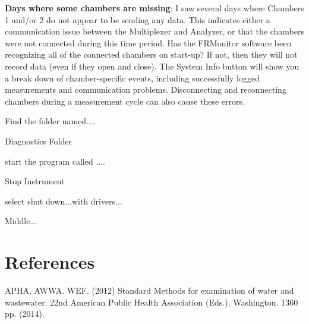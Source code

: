 \documentclass[12pt]{../SOP3}\usepackage[]{graphicx}\usepackage[]{color}
\begin{document}
\NP \textbf{Days where some chambers are missing}: 
 I saw several days where Chambers 1 and/or 2 do not appear to be sending any data. This indicates either a communication issue between the Multiplexer and Analyzer, or that the chambers were not connected during this time period. Has the FRMonitor software been recognizing all of the connected chambers on start-up?  If not, then they will not record data (even if they open and close). The System Info button will show you a break down of chamber-specific events, including successfully logged measurements and communication problems. Disconnecting and reconnecting chambers during a measurement cycle can also cause these errors.





Find the folder named....

Diagnostics Folder

start the program called ....

Stop Instrument

select shut down...with drivers...

Middle... 




\section{References}

%

\NP APHA, AWWA. WEF. (2012) Standard Methods for examination of water and wastewater. 22nd American Public Health Association (Eds.). Washington. 1360 pp. (2014).
\end{document}
